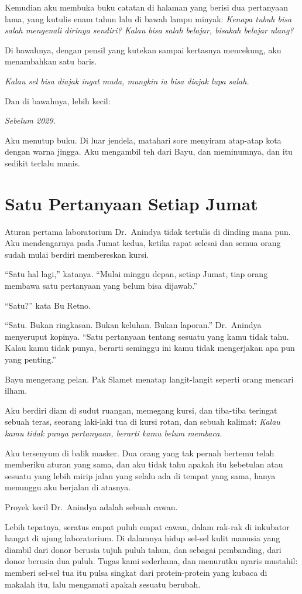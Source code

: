 \documentclass[11pt,twoside,openany]{book}
\makeatletter
\newcommand{\scenebreak}{\par\vspace{0.9em}{\centering\textsc{*\hspace{0.7em}*\hspace{0.7em}*}\par}\vspace{0.9em}\@afterindentfalse\@afterheading}
\makeatother
\begin{document}
Kemudian aku membuka buku catatan di halaman yang berisi dua pertanyaan lama, yang kutulis enam tahun lalu di bawah lampu minyak: \emph{Kenapa tubuh bisa salah mengenali dirinya sendiri? Kalau bisa salah belajar, bisakah belajar ulang?}

Di bawahnya, dengan pensil yang kutekan sampai kertasnya mencekung, aku menambahkan satu baris.

\emph{Kalau sel bisa diajak ingat muda, mungkin ia bisa diajak lupa salah.}

Dan di bawahnya, lebih kecil:

\emph{Sebelum 2029.}

Aku menutup buku. Di luar jendela, matahari sore menyiram atap-atap kota dengan warna jingga. Aku mengambil teh dari Bayu, dan meminumnya, dan itu sedikit terlalu manis.

\chapter{Satu Pertanyaan Setiap Jumat}
Aturan pertama laboratorium Dr.~Anindya tidak tertulis di dinding mana pun. Aku mendengarnya pada Jumat kedua, ketika rapat selesai dan semua orang sudah mulai berdiri membereskan kursi.

``Satu hal lagi,'' katanya. ``Mulai minggu depan, setiap Jumat, tiap orang membawa satu pertanyaan yang belum bisa dijawab.''

``Satu?'' kata Bu Retno.

``Satu. Bukan ringkasan. Bukan keluhan. Bukan laporan.'' Dr.~Anindya menyeruput kopinya. ``Satu pertanyaan tentang sesuatu yang kamu tidak tahu. Kalau kamu tidak punya, berarti seminggu ini kamu tidak mengerjakan apa pun yang penting.''

Bayu mengerang pelan. Pak Slamet menatap langit-langit seperti orang mencari ilham.

Aku berdiri diam di sudut ruangan, memegang kursi, dan tiba-tiba teringat sebuah teras, seorang laki-laki tua di kursi rotan, dan sebuah kalimat: \emph{Kalau kamu tidak punya pertanyaan, berarti kamu belum membaca.}

Aku tersenyum di balik masker. Dua orang yang tak pernah bertemu telah memberiku aturan yang sama, dan aku tidak tahu apakah itu kebetulan atau sesuatu yang lebih mirip jalan yang selalu ada di tempat yang sama, hanya menunggu aku berjalan di atasnya.

\scenebreak
Proyek kecil Dr.~Anindya adalah sebuah cawan.

Lebih tepatnya, seratus empat puluh empat cawan, dalam rak-rak di inkubator hangat di ujung laboratorium. Di dalamnya hidup sel-sel kulit manusia yang diambil dari donor berusia tujuh puluh tahun, dan sebagai pembanding, dari donor berusia dua puluh. Tugas kami sederhana, dan menurutku nyaris mustahil: memberi sel-sel tua itu pulsa singkat dari protein-protein yang kubaca di makalah itu, lalu mengamati apakah sesuatu berubah.
\end{document}
